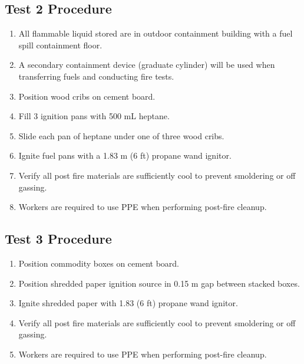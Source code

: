 \documentclass[12pt,oneside]{book}
\begin{document}
\subsection{Test 2 Procedure}
\label{procedure2}
\begin{enumerate}
  \item All flammable liquid stored are in outdoor containment building with a fuel spill containment floor. 
  \item A secondary containment device (graduate cylinder) will be used when transferring fuels and conducting fire tests.
  \item Position wood cribs on cement board.
  \item Fill 3 ignition pans with 500 mL heptane.
  \item Slide each pan of heptane under one of three wood cribs. 
  \item Ignite fuel pans with a 1.83 m (6 ft) propane wand ignitor.
  \item Verify all post fire materials are sufficiently cool to prevent smoldering or off gassing.
  \item Workers are required to use PPE when performing post-fire cleanup.

\end{enumerate}

\subsection{Test 3 Procedure}
\label{procedure3}
\begin{enumerate}
  \item Position commodity boxes on cement board.
  \item Position shredded paper ignition source in 0.15 m gap between stacked boxes.
  \item Ignite shredded paper with 1.83 (6 ft) propane wand ignitor.
  \item Verify all post fire materials are sufficiently cool to prevent smoldering or off gassing.
  \item Workers are required to use PPE when performing post-fire cleanup.
\end{enumerate}
\end{document}
